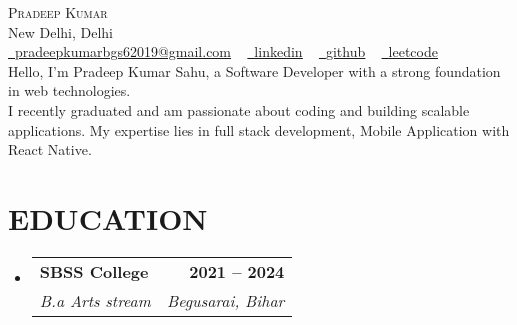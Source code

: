 \documentclass[letterpaper,11pt]{article}
\makeatletter
\newcommand{\resumeSubheading}[4]{
  \vspace{-2pt}\item
    \begin{tabular*}{1.0\textwidth}[t]{l@{\extracolsep{\fill}}r}
      \textbf{\large#1} & \textbf{\small #2} \\
      \textit{\large#3} & \textit{\small #4} \\
      
    \end{tabular*}\vspace{-7pt}
}
\newcommand{\resumeSubHeadingListStart}{\begin{itemize}[leftmargin=0.0in, label={}]}
\newcommand{\resumeSubHeadingListEnd}{\end{itemize}}
\makeatother
\begin{document}


\begin{center}
    {\Huge \scshape Pradeep Kumar} \\ \vspace{1pt}
    New Delhi, Delhi \\ \vspace{1pt}
    \small   \href{mailto:pradeepkumarbgs62019@gmail.com}{\raisebox{-0.2\height}\faEnvelope\  \underline{pradeepkumarbgs62019@gmail.com}} ~ 
    \href{https://www.linkedin.com/in/pradeep-sahu-180b3423a/}{\raisebox{-0.2\height}\faLinkedinSquare\ \underline{linkedin}}  ~
    \href{https://github.com/pradeepbgs}{\raisebox{-0.2\height}\faGithub\ \underline{github}} ~
    \href{https://leetcode.com/u/pussy_js/}{\raisebox{-0.2\height}\faHackerrank\ \underline{leetcode}} ~
    \vspace{-8pt} \\
    \vspace{18pt}
    Hello, I'm Pradeep Kumar Sahu, a Software Developer with a strong foundation in web technologies. \\ 
    I recently graduated and am passionate about coding and building scalable applications. My expertise lies in full stack development, Mobile Application with React Native.
    \vspace{-8pt}
\end{center}



\section{EDUCATION}
  \resumeSubHeadingListStart
    \resumeSubheading
      {SBSS College  }{ 2021 --  2024}
      {B.a Arts stream \textbf{} \textbf{}}{Begusarai, Bihar}
  \resumeSubHeadingListEnd
  

\end{document}
